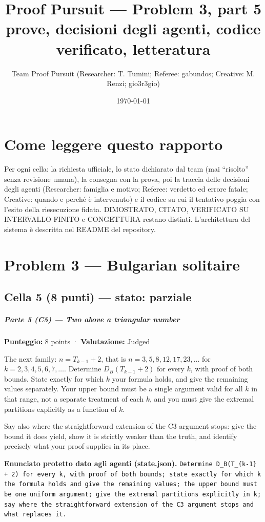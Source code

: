 \documentclass[11pt,a4paper]{article}
\title{Proof Pursuit --- Problem 3, part 5\\ \large prove, decisioni degli agenti, codice verificato, letteratura}
\author{Team Proof Pursuit (Researcher: T. Tumini; Referee: gabundos; Creative: M. Renzi; gio3r3gio)}
\date{\today}
\begin{document}
\maketitle\tableofcontents
\section*{Come leggere questo rapporto}
Per ogni cella: la richiesta ufficiale, lo stato dichiarato dal team (mai ``risolto'' senza revisione umana), la consegna
con la prova, poi la traccia delle decisioni degli agenti (Researcher: famiglia e motivo; Referee: verdetto ed errore
fatale; Creative: quando e perché è intervenuto) e il codice su cui il tentativo poggia con l'esito della riesecuzione
fidata. DIMOSTRATO, CITATO, VERIFICATO SU INTERVALLO FINITO e CONGETTURA restano distinti. L'architettura del sistema
è descritta nel README del repository.
\section{Problem 3 — Bulgarian solitaire}
\subsection{Cella 5 (8 punti) — stato: parziale}
\subparagraph{Parte 5 (C5) --- Two above a triangular
number}\label{parte-5-c5-two-above-a-triangular-number}

\textbf{Punteggio:} 8 points · \textbf{Valutazione:} Judged

The next family: \(n = T_{k-1} + 2\), that is
\(n = 3, 5, 8, 12, 17, 23, \ldots\) for
\(k = 2, 3, 4, 5, 6, 7, \ldots\). Determine \(D_B(T_{k-1} + 2)\) for
every \(k\), with proof of both bounds. State exactly for which \(k\)
your formula holds, and give the remaining values separately. Your upper
bound must be a single argument valid for all \(k\) in that range, not a
separate treatment of each \(k\), and you must give the extremal
partitions explicitly as a function of \(k\).

Say also where the straightforward extension of the C3 argument stops:
give the bound it does yield, show it is strictly weaker than the truth,
and identify precisely what your proof supplies in its place.

\textbf{Enunciato protetto dato agli agenti (state.json).} \texttt{Determine D\_B(T\_\{k-1\} + 2) for every k, with proof of both bounds; state exactly for which k the formula holds and give the remaining values; the upper bound must be one uniform argument; give the extremal partitions explicitly in k; say where the straightforward extension of the C3 argument stops and what replaces it.}
\end{document}
